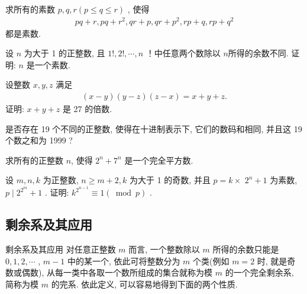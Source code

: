 \documentclass[aspectratio=169]{ctexbeamer}
\theoremstyle{definition}
\begin{document}
\setcounter{theorem}{0}
\begin{frame}[t]
	\begin{example}
		求所有的素数 $p ,  q ,  r(p \leqslant q \leqslant r)$ , 使得
		\begin{align*}
			p q+r, p q+r^{2}, q r+p, q r+p^{2}, r p+q, r p+q^{2}
		\end{align*}
		都是素数.
	\end{example}
\end{frame}

\begin{frame}[t]
	\begin{example}
		设 $n$ 为大于 1 的正整数, 且 $1!, 2!, \cdots, n$ ！中任意两个数除以 $n$所得的余数不同. 证明: $n$ 是一个素数.
	\end{example}
\end{frame}

\begin{frame}[t]
	\begin{example}
		设整数 $x ,  y ,  z$ 满足
		\begin{align}\label{eq:同余的概念与基本性质-例3}
			(x-y)(y-z)(z-x)=x+y+z .
		\end{align}
		证明: $x+y+z$ 是 27 的倍数.
	\end{example}
\end{frame}

\begin{frame}[t]
	\begin{example}
		是否存在 19 个不同的正整数, 使得在十进制表示下, 它们的数码和相同, 并且这 19 个数之和为 1999 ?
	\end{example}
\end{frame}

\begin{frame}[t]
	\begin{example}
		求所有的正整数 $n$, 使得 $2^{n}+7^{n}$ 是一个完全平方数.
	\end{example}
\end{frame}

\begin{frame}[t]
	\begin{example}
		设 $m ,  n ,  k$ 为正整数,  $n \geqslant m+2, k$ 为大于 1 的奇数, 并且 $p=k \times$ $2^{n}+1$ 为素数,  $p \mid 2^{2^{m}}+1$ . 证明:  $k^{2^{n-1}} \equiv 1(\bmod p)$ .
	\end{example}
\end{frame}

\subsection{剩余系及其应用}\setcounter{theorem}{0}
\begin{frame}{剩余系及其应用}
	对任意正整数 $m$ 而言, 一个整数除以 $m$ 所得的余数只能是 $0,1,2, \cdots$ ,  $m-1$ 中的某一个, 依此可将整数分为 $m$ 个类(例如 $m=2$ 时, 就是奇数或偶数), 从每一类中各取一个数所组成的集合就称为模 $m$ 的一个完全剩余系, 简称为模 $m$ 的完系. 依此定义, 可以容易地得到下面的两个性质.
\end{frame}
\end{document}
